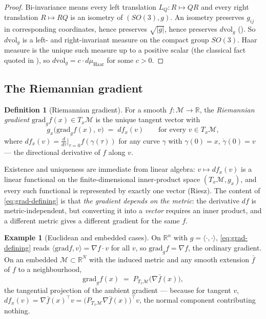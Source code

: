 \documentclass[11pt,a4paper]{report}
\theoremstyle{definition}
\newtheorem{definition}[definition]{Definition}
\newtheorem{example}[example]{Example}
\theoremstyle{remark}
\newcommand{\RR}{\mathbb R}
\begin{document}
\begin{proof}
Bi-invariance means every left translation $L_Q:R\mapsto QR$ and every right
translation $R\mapsto RQ$ is an isometry of $(SO(3),g)$. An isometry
preserves $g_{ij}$ in corresponding coordinates, hence preserves
$\sqrt{|g|}$, hence preserves $d\mathrm{vol}_g$
(). So $d\mathrm{vol}_g$ is a left- and
right-invariant measure on the compact group $SO(3)$. Haar measure is the
unique such measure up to a positive scalar (the classical fact quoted in
), so $d\mathrm{vol}_g=c\cdot d\mu_{\mathrm{Haar}}$ for
some $c>0$.
\end{proof}

\subsection{The Riemannian gradient}
\label{sec:riemannian-gradient}

\begin{definition}[Riemannian gradient]
\label{def:riemannian-gradient}
For a smooth $f:\mathcal M\to\RR$, the \emph{Riemannian gradient}
$\mathrm{grad}_gf(x)\in T_x\mathcal M$ is the unique tangent vector with
\begin{equation}
\label{eq:grad-defining}
g_x\bigl(\mathrm{grad}_gf(x),\,v\bigr) \;=\; df_x(v)
\qquad\text{for every } v\in T_x\mathcal M ,
\end{equation}
where $df_x(v)=\frac{d}{d\tau}\big|_{\tau=0}f(\gamma(\tau))$ for any curve
$\gamma$ with $\gamma(0)=x$, $\dot\gamma(0)=v$ --- the directional
derivative of $f$ along $v$.
\end{definition}

Existence and uniqueness are immediate from linear algebra: $v\mapsto df_x(v)$
is a linear functional on the finite-dimensional inner-product space
$(T_x\mathcal M,g_x)$, and every such functional is represented by exactly
one vector (Riesz). The content of \eqref{eq:grad-defining} is that
\emph{the gradient depends on the metric}: the derivative $df$ is
metric-independent, but converting it into a \emph{vector} requires an inner
product, and a different metric gives a different gradient for the same $f$.

\begin{example}[Euclidean and embedded cases]
\label{ex:gradient-cases}
On $\RR^n$ with $g=\langle\cdot,\cdot\rangle$, \eqref{eq:grad-defining} reads
$\langle\mathrm{grad}f,v\rangle=\nabla f\cdot v$ for all $v$, so
$\mathrm{grad}_gf=\nabla f$, the ordinary gradient. On an embedded
$\mathcal M\subset\RR^N$ with the induced metric and any smooth extension
$\bar f$ of $f$ to a neighbourhood,
\[
\mathrm{grad}_g f(x) \;=\; P_{T_x\mathcal M}\bigl(\nabla\bar f(x)\bigr) ,
\]
the tangential projection of the ambient gradient --- because for tangent
$v$, $df_x(v)=\nabla\bar f(x)^\top v=\bigl(P_{T_x\mathcal M}\nabla\bar f(x)\bigr)^\top v$,
the normal component contributing nothing.
\end{example}
\end{document}
